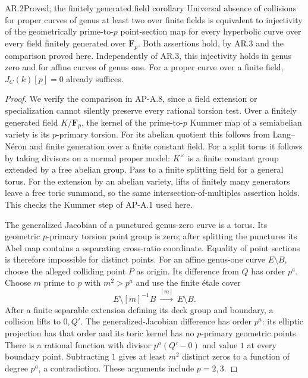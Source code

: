 \begin{claim}{AR.2}{Proved; the finitely generated field corollary}
Universal absence of collisions for proper curves of genus at least two
over finite fields is equivalent to injectivity of the geometrically
prime-to-$p$ point-section map for every hyperbolic curve over every
field finitely generated over $\mathbf F_p$.  Both assertions hold,
by AR.3 and the comparison proved here.  Independently of AR.3, this
injectivity holds in genus zero and for affine curves of genus one.
For a proper curve over a finite field, $J_C(k)[p]=0$ already suffices.
\end{claim}
\begin{proof}
We verify the comparison in AP-A.8, since a field extension or
specialization cannot silently preserve every rational torsion test.
Over a finitely generated field $K/\mathbf F_p$, the kernel of the
prime-to-$p$ Kummer map of a semiabelian variety is its $p$-primary
torsion.  For its abelian quotient this follows from Lang--N\'eron and
finite generation over a finite constant field.  For a split torus it
follows by taking divisors on a normal proper model: $K^\times$ is a
finite constant group extended by a free abelian group.  Pass to a
finite splitting field for a general torus.  For the extension by an
abelian variety, lifts of finitely many generators leave a free toric
summand, so the same intersection-of-multiples assertion holds.  This
checks the Kummer step of AP-A.1 used here.

The generalized Jacobian of a punctured genus-zero curve is a torus.
Its geometric $p$-primary torsion point group is zero; after splitting
the punctures its Abel map contains a separating cross-ratio
coordinate.  Equality of point sections is therefore impossible for
distinct points.  For an affine genus-one curve $E\setminus B$, choose
the alleged colliding point $P$ as origin.  Its difference from $Q$
has order $p^a$.  Choose $m$ prime to $p$ with $m^2>p^a$ and use the
finite \'etale cover
\[
 E\setminus[m]^{-1}B\ \xrightarrow{[m]}\ E\setminus B.
\]
After a finite separable extension defining its deck group and boundary,
a collision lifts to $0,Q'$.  The generalized-Jacobian difference has
order $p^a$: its elliptic projection has that order and its toric kernel
has no $p$-primary geometric points.  There is a rational function with
divisor $p^a(Q'-0)$ and value $1$ at every boundary point.  Subtracting
$1$ gives at least $m^2$ distinct zeros to a function of degree $p^a$,
a contradiction.  These arguments include $p=2,3$.


\end{proof}
